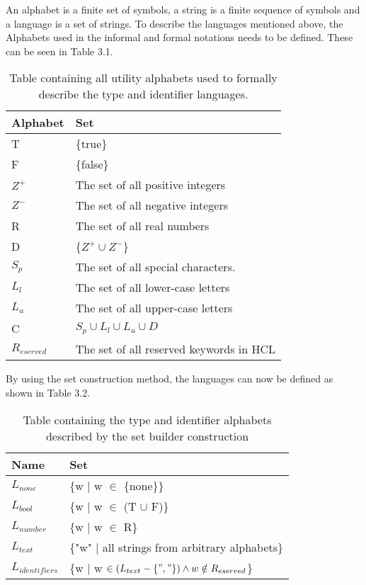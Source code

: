 An alphabet is a finite set of symbols, a string is a finite sequence of symbols and a language is a set of strings.
To describe the languages mentioned above, the Alphabets used in the informal and formal notations needs to be defined. These can be seen in Table 3.1.

\begin{table}[!htb]
	\centering
	\begin{tabular}{|l|l|}
		\hline
		\textbf{Alphabet} & \textbf{Set}                            \\ \hline
		T                 & \{true\}                                \\ \hline
		F                 & \{false\}                               \\ \hline
		$Z^+$             & The set of all positive integers        \\ \hline
		$Z^-$             & The set of all negative integers        \\ \hline
		R                 & The set of all real numbers             \\ \hline
		D                 & \{$Z^+ \cup Z^-$\}                      \\ \hline
		$S_p$             & The set of all special characters.      \\ \hline
		$L_l$             & The set of all lower-case letters       \\ \hline
		$L_u$             & The set of all upper-case letters       \\ \hline
		C                 & $S_p \cup L_l \cup L_u \cup D$          \\ \hline
		$R_{eserved}$       & The set of all reserved keywords in HCL \\ \hline
	\end{tabular}
	\caption{Table containing all utility alphabets used to formally describe the type and identifier languages.}
\end{table}

By using the set construction method, the languages can now be defined as shown in Table 3.2.

\begin{table}[!htb]
	\centering
	\label{my-label}
	\begin{tabular}{|l|l|}
		\hline
		\textbf{Name}     & \textbf{Set}                                    \\ \hline
		$L_{none}$        & \{w | w $\in$ \{none\}\}                        \\ \hline
		$L_{bool}$        & \{w | w $\in$ (T $\cup$ F)\}                    \\ \hline
		$L_{number}$      & \{w | w $\in$ R\}                               \\ \hline
		$L_{text}$        & \{"w" | all strings from arbitrary alphabets\}  \\ \hline
		$L_{identifiers}$ & \{w | w $\in (L_{text} - \{", "\}) \wedge w \notin R_{eserved}$\} \\ \hline
	\end{tabular}
	\caption{Table containing the type and identifier alphabets described by the set builder construction}
\end{table}

